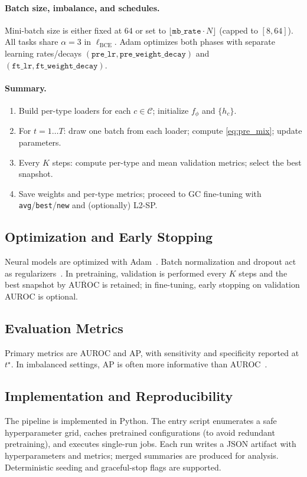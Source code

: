 \documentclass[journal,article,submit,pdftex,moreauthors]{Definitions/mdpi}
\begin{document}
\paragraph{Batch size, imbalance, and schedules.}
Mini-batch size is either fixed at $64$ or set to $\lfloor \texttt{mb\_rate}\cdot N\rfloor$ (capped to $[8,64]$). All tasks share $\alpha{=}3$ in $\ell_{\mathrm{BCE}}$. Adam optimizes both phases with separate learning rates/decays $(\texttt{pre\_lr},\texttt{pre\_weight\_decay})$ and $(\texttt{ft\_lr},\texttt{ft\_weight\_decay})$.

\paragraph{Summary.}
\begin{enumerate}[topsep=0pt,itemsep=1pt,leftmargin=12pt]
\item Build per-type loaders for each $c\in\mathcal{C}$; initialize $f_\phi$ and $\{h_c\}$.
\item For $t=1\ldots T$: draw one batch from each loader; compute \eqref{eq:pre_mix}; update parameters.
\item Every $K$ steps: compute per-type and mean validation metrics; select the best snapshot.
\item Save weights and per-type metrics; proceed to GC fine-tuning with \texttt{avg}/\texttt{best}/\texttt{new} and (optionally) L2-SP.
\end{enumerate}

\subsection{Optimization and Early Stopping}
Neural models are optimized with Adam~\citep{Kingma2015_Adam}. Batch normalization and dropout act as regularizers~\citep{Ioffe2015_BN,Srivastava2014_Dropout}. In pretraining, validation is performed every $K$ steps and the best snapshot by $\overline{\mathrm{AUROC}}$ is retained; in fine-tuning, early stopping on validation AUROC is optional.

\subsection{Evaluation Metrics}
Primary metrics are AUROC and AP, with sensitivity and specificity reported at $t^\star$. In imbalanced settings, AP is often more informative than AUROC~\citep{Saito2015_PR}.

\subsection{Implementation and Reproducibility}
The pipeline is implemented in Python. The entry script enumerates a safe hyperparameter grid, caches pretrained configurations (to avoid redundant pretraining), and executes single-run jobs. Each run writes a JSON artifact with hyperparameters and metrics; merged summaries are produced for analysis. Deterministic seeding and graceful-stop flags are supported.
\end{document}
